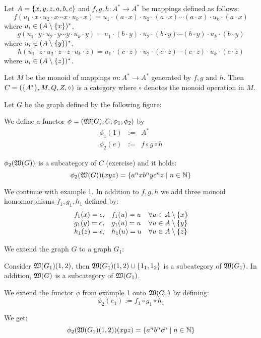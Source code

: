 \bigskip
\begin{example}
Let $A = \mbox{$\{x,y,z,a,b,c\}$}$ and $f, g, h: A^* \to A^*$ be mappings defined
as follows:
\[ f(u_1 \cdot x \cdot u_2 \cdot x \cdots x \cdot u_k \cdot x) = 
u_1 \cdot (a \cdot x) \cdot u_2 \cdot (a \cdot x) \cdots (a \cdot x) \cdot u_k
\cdot (a \cdot x) \]
where $u_i \in (A \setminus \mbox{$\{x\}$})^*$,
\[ g(u_1 \cdot y \cdot u_2 \cdot y \cdots y \cdot u_k \cdot y) = 
u_1 \cdot (b \cdot y) \cdot u_2 \cdot (b \cdot y) \cdots (b \cdot y) \cdot u_k
\cdot (b \cdot y) \] 
where $u_i \in (A \setminus \mbox{$\{y\}$})^*$,
\[ h(u_1 \cdot z \cdot u_2 \cdot z \cdots z \cdot u_k \cdot z) = 
u_1 \cdot (c \cdot z) \cdot u_2 \cdot (c \cdot z) \cdots (c \cdot z) \cdot u_k
\cdot (c \cdot z) \]
where $u_i \in (A \setminus \mbox{$\{z\}$})^*$.

Let $M$ be the monoid of mappings $m: A^* \to A^*$ generated by $f, g$ and $h$.
Then $C = (\mbox{$\{A^*\}$}, M, Q, Z, \circ)$ is a category where $\circ$ denotes
the monoid operation in $M$.

Let $G$ be the graph defined by the following figure:

\begin{center}

\end{center}

We define a functor $\phi = (\mbox{$\mathfrak{W}({G})$}, C, \phi_1, \phi_2)$ by
\begin{eqnarray*}
\phi_1(1) & := & A^* \\
\phi_2(e) & := & f \circ g \circ h
\end{eqnarray*}

$\phi_2(\mbox{$\mathfrak{W}({G})$})$ is a subcategory of $C$ (exercise) and it holds:
\[ \phi_2(\mbox{$\mathfrak{W}({G})$})(xyz) = \mbox{$\{a^n x b^n y c^n z \mid n \in \mathbb{N}\}$}
\]
\end{example}

\bigskip
\begin{example}
We continue with example 1. In addition to $f,g,h$ we add three monoid
homomorphisms $f_1, g_1, h_1$ defined by:
\[\begin{array}{l@{,\quad}l@{\quad}l}
f_1(x) = \epsilon & f_1(u) = u & \forall u \in A \setminus \setof{x} \\
g_1(y) = \epsilon & g_1(u) = u & \forall u \in A \setminus \setof{y} \\
h_1(z) = \epsilon & h_1(u) = u & \forall u \in A \setminus \setof{z}
\end{array}\]

We extend the graph $G$ to a graph $G_1$:

\begin{center}

\end{center}

Consider $\mbox{$\mathfrak{W}({G_1})$}(1,2)$, then $\mbox{$\mathfrak{W}({G_1})$}(1,2) \cup \mbox{$\{1_1,
1_2\}$}$ is a subcategory of $\mbox{$\mathfrak{W}({G_1})$}$. In addition, $\mbox{$\mathfrak{W}({G})$}$ is a subcategory of
$\mbox{$\mathfrak{W}({G_1})$}$.

We extend the functor $\phi$ from example 1 onto $\mbox{$\mathfrak{W}({G_1})$}$ by defining:
\[ \phi_2(e_1) := f_1 \circ g_1 \circ h_1 \]

We get:
\[ \phi_2(\mbox{$\mathfrak{W}({G_1})$}(1,2))(xyz) = \mbox{$\{a^n b^n c^n \mid n \in \mathbb{N}\}$}
\]
\end{example}

